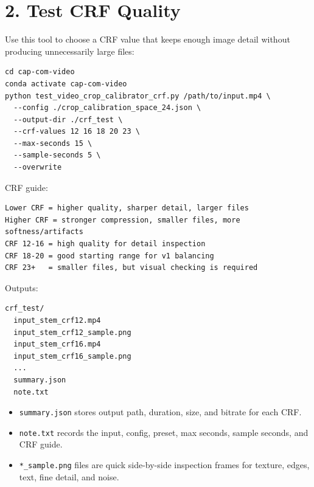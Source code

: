 \documentclass[11pt,a4paper]{article}
\begin{document}
\section{2. Test CRF Quality}
Use this tool to choose a CRF value that keeps enough image detail without producing unnecessarily large files:
\begin{verbatim}
cd cap-com-video
conda activate cap-com-video
python test_video_crop_calibrator_crf.py /path/to/input.mp4 \
  --config ./crop_calibration_space_24.json \
  --output-dir ./crf_test \
  --crf-values 12 16 18 20 23 \
  --max-seconds 15 \
  --sample-seconds 5 \
  --overwrite
\end{verbatim}
CRF guide:
\begin{verbatim}
Lower CRF = higher quality, sharper detail, larger files
Higher CRF = stronger compression, smaller files, more softness/artifacts
CRF 12-16 = high quality for detail inspection
CRF 18-20 = good starting range for v1 balancing
CRF 23+   = smaller files, but visual checking is required
\end{verbatim}
Outputs:
\begin{verbatim}
crf_test/
  input_stem_crf12.mp4
  input_stem_crf12_sample.png
  input_stem_crf16.mp4
  input_stem_crf16_sample.png
  ...
  summary.json
  note.txt
\end{verbatim}
\begin{itemize}
\item \texttt{summary.json} stores output path, duration, size, and bitrate for each CRF.
\item \texttt{note.txt} records the input, config, preset, max seconds, sample seconds, and CRF guide.
\item \texttt{*\_sample.png} files are quick side-by-side inspection frames for texture, edges, text, fine detail, and noise.
\end{itemize}
\end{document}
